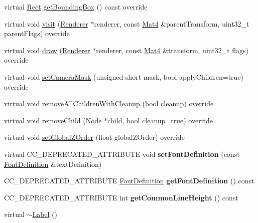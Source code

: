 \begin{DoxyCompactItemize}
virtual \hyperlink{classRect}{Rect} \hyperlink{classLabel_a0b586d58df89f97fca24231c794335ca}{get\+Bounding\+Box} () const override
\item 
virtual void \hyperlink{classLabel_a380d30d32cf8f19f28418e706d5929b5}{visit} (\hyperlink{classRenderer}{Renderer} $\ast$renderer, const \hyperlink{classMat4}{Mat4} \&parent\+Transform, uint32\+\_\+t parent\+Flags) override
\item 
virtual void \hyperlink{classLabel_a01fee2eb2db379b5811b05ee02ba685f}{draw} (\hyperlink{classRenderer}{Renderer} $\ast$renderer, const \hyperlink{classMat4}{Mat4} \&transform, uint32\+\_\+t flags) override
\item 
virtual void \hyperlink{classLabel_a8657a6d35049d6e66a79759f93890a6d}{set\+Camera\+Mask} (unsigned short mask, bool apply\+Children=true) override
\item 
virtual void \hyperlink{classLabel_a5ea31447a69e1a0974aee74ad9a072e2}{remove\+All\+Children\+With\+Cleanup} (bool \hyperlink{classNode_aa2de84c6cdeec9cd647d236c30ee0567}{cleanup}) override
\item 
virtual void \hyperlink{classLabel_adbd0b3a732d798e37ee50faa99453647}{remove\+Child} (\hyperlink{classNode}{Node} $\ast$child, bool \hyperlink{classNode_aa2de84c6cdeec9cd647d236c30ee0567}{cleanup}=true) override
\item 
virtual void \hyperlink{classLabel_a8a3965a4546b01df9e3f1302c6ce62dc}{set\+Global\+Z\+Order} (float global\+Z\+Order) override
\item 
\mbox{\label{classLabel_ac7a254911a42c6eeeabd2e848d645fdd}} 
virtual C\+C\+\_\+\+D\+E\+P\+R\+E\+C\+A\+T\+E\+D\+\_\+\+A\+T\+T\+R\+I\+B\+U\+TE void {\bfseries set\+Font\+Definition} (const \hyperlink{structFontDefinition}{Font\+Definition} \&text\+Definition)
\item 
\mbox{\label{classLabel_ab930ea670d32eb899575de588a81ab45}} 
C\+C\+\_\+\+D\+E\+P\+R\+E\+C\+A\+T\+E\+D\+\_\+\+A\+T\+T\+R\+I\+B\+U\+TE \hyperlink{structFontDefinition}{Font\+Definition} {\bfseries get\+Font\+Definition} () const
\item 
\mbox{\label{classLabel_a69eb7a73d9f1db0d8c8080044715addc}} 
C\+C\+\_\+\+D\+E\+P\+R\+E\+C\+A\+T\+E\+D\+\_\+\+A\+T\+T\+R\+I\+B\+U\+TE int {\bfseries get\+Common\+Line\+Height} () const
\item 
virtual \hyperlink{classLabel_ae0405d591a2ff63c03b104435e2a3066}{$\sim$\+Label} ()

\end{DoxyCompactItemize}
